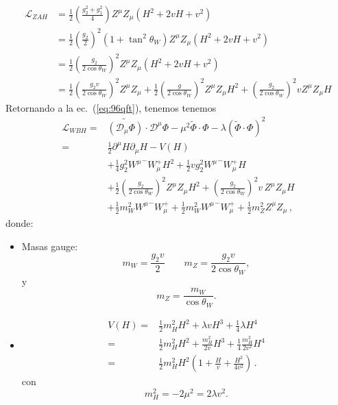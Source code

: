 \begin{frame}
\begin{align}
  \mathcal{L}_{ZAH}&=\frac{1}{2}\left(\frac{g_2^2+g_1^2}{4}\right)Z^\mu Z_\mu
  \left(H^2+2vH+v^2\right)\nonumber\\
  &=\frac{1}{2}\left(\frac{g_2}{2}\right)^2\left(1+\tan^2\theta_W\right)Z^\mu Z_\mu\left(H^2+2vH+v^2\right)\nonumber\\
  &=\frac{1}{2}\left(\frac{g_2}{2\cos\theta_W}\right)^2Z^\mu Z_\mu\left(H^2+2vH+v^2\right)\nonumber\\
  &=\frac{1}{2}\left(\frac{g_2v}{2\cos\theta_W}\right)^2Z^\mu Z_\mu+\frac{1}{2}\left(\frac{g}{2\cos\theta_W}\right)^2Z^\mu Z_\mu H^2
  +\left(\frac{g_2}{2\cos\theta_W}\right)^2vZ^\mu Z_\mu H
\end{align}
Retornando a la ec.~(\ref{eq:96qft}), tenemos
tenemos
\begin{align}
  \label{eq:lwbhfin}
  \mathcal{L}_{W B H}=&\widetilde{\left( \mathcal{D}_\mu{\Phi} \right)}\cdot\mathcal{D}^\mu\Phi-\mu^2\widetilde{\Phi}\cdot\Phi-\lambda \left( \widetilde{\Phi}\cdot\Phi \right)^2 \nonumber\\
  =&\frac{1}{2}\partial^\mu H\partial_\mu H-V(H)\nonumber\\
&+\frac{1}{4}g_2^2{W^\mu}^-W_\mu^+H^2+\frac{1}{2}vg_2^2{W^\mu}^-W_\mu^+H\nonumber\\
  &+\frac{1}{2}\left(\frac{g_2}{2\cos\theta_W}\right)^2Z^\mu Z_\mu H^2+\left(\frac{g_2}{2\cos\theta_W}\right)^2v\,Z^\mu Z_\mu H\nonumber\\
  &+\frac{1}{2}m_W^2{W^\mu}^-W_\mu^++\frac{1}{2}m_W^2{W^\mu}^-W_\mu^+ +\frac{1}{2}m_Z^2Z^\mu Z_\mu\,,
\end{align}
donde:
\begin{itemize} %
\item Masas gauge:
\begin{equation}
  m_W=\frac{g_2v}{2}
  \qquad 
  m_Z=\frac{g_2v}{2\cos\theta_W},
\end{equation}
y
\begin{equation}
  m_Z=\frac{m_W}{\cos\theta_W}.
\end{equation}
\item
  \begin{align}
    V(H)=&\tfrac{1}{2}m_H^2H^2+\lambda vH^3+\tfrac{1}{4}\lambda H^4\nonumber\\
    =&\frac{1}{2}m_H^2H^2+\frac{m_H^2}{2v}H^3+\frac{1}{4}\frac{m_H^2}{2v^2} H^4\nonumber\\
    =&\frac{1}{2}m_H^2H^2\left(1+\frac{H}{v}+\frac{H^2}{4v^2}\right)\,.
  \end{align}
con
\begin{equation}
  m_H^2=-2\mu^2=2\lambda v^2.
\end{equation}


\end{itemize}
\end{frame}
